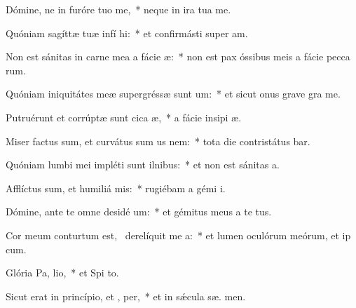 \item Dómine, ne in furóre tuo  me,~* neque in ira tua  me.
\item Quóniam sagíttæ tuæ infí  hi:~* et confirmásti super   am.
\item Non est sánitas in carne mea a fácie  æ:~* non est pax óssibus meis a fácie pecca rum.
\item Quóniam iniquitátes meæ supergréssæ sunt  um:~* et sicut onus grave gra   me.
\item Putruérunt et corrúptæ sunt cica æ,~* a fácie insipi æ.
\item Miser factus sum, et curvátus sum us  nem:~* tota die contristátus bar.
\item Quóniam lumbi mei impléti sunt ilnibus:~* et non est sánitas   a.
\item Afflíctus sum, et humiliá  mis:~* rugiébam a gémi  i.
\item Dómine, ante te omne desidé um:~* et gémitus meus a te   tus.
\item Cor meum conturtum est,~\pscross{} derelíquit me  a:~* et lumen oculórum meórum, et ip   cum.
\item Glória Pa,  lio,~* et Spi to.
\item Sicut erat in princípio, et ,  per,~* et in sǽcula sæ. men.
